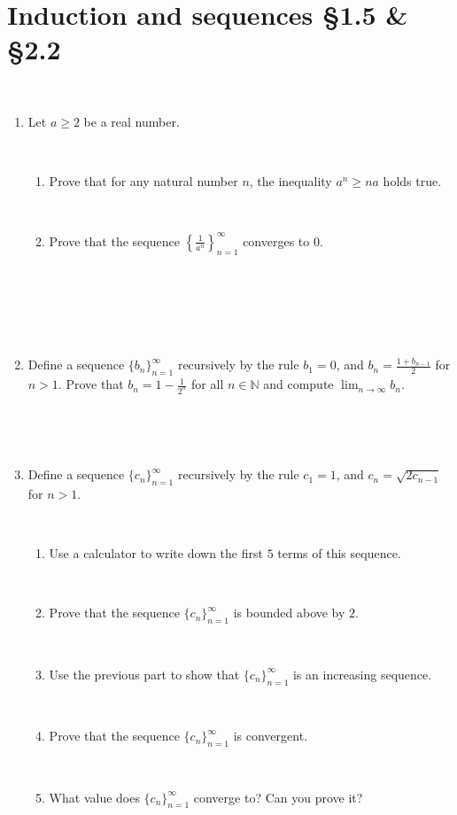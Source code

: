 \documentclass[12pt]{amsart}
\newcommand{\N}{\mathbb{N}}
\begin{document}
	
	\thispagestyle{empty}
	
	\section*{Induction and sequences \S1.5 \& \S 2.2}

	\

\begin{enumerate}


\item Let $a \geq 2$ be a real number. 

\

\begin{enumerate}
\item Prove that for any natural number $n$, the inequality $a^n \geq na$ holds true.

\

\item Prove that the sequence  $\left\{ \frac{1}{a^n} \right\}_{n=1}^\infty$ converges to $0$. 

\

\end{enumerate}

\

\

\item Define a sequence $\{ b_n\}_{n=1}^\infty$ recursively by the rule $b_1=0$, and $\displaystyle b_{n} = \frac{1+ b_{n-1}}{2}$ for $n>1$. Prove that $\displaystyle b_n = 1 - \frac{1}{2^n}$ for all $n\in \N$ and compute $\displaystyle\lim_{n\to \infty} b_n$.

\

\

\item Define a sequence $\{ c_n\}_{n=1}^\infty$ recursively by the rule $c_1=1$, and $\displaystyle c_{n} = \sqrt{2 c_{n-1}}$ for $n>1$. 

\

\begin{enumerate}
\item Use a calculator to write down the first $5$ terms of this sequence.

\


\item Prove that the sequence $\{c_n\}_{n=1}^\infty$ is bounded above by $2$.

\

\item Use the previous part to show that $\{c_n\}_{n=1}^\infty$ is an increasing sequence.

\

\item Prove that the sequence $\{c_n\}_{n=1}^\infty$ is convergent.

\

\item What value does $\{c_n\}_{n=1}^\infty$ converge to? Can you prove it?
\end{enumerate}







\end{enumerate}
\end{document}
